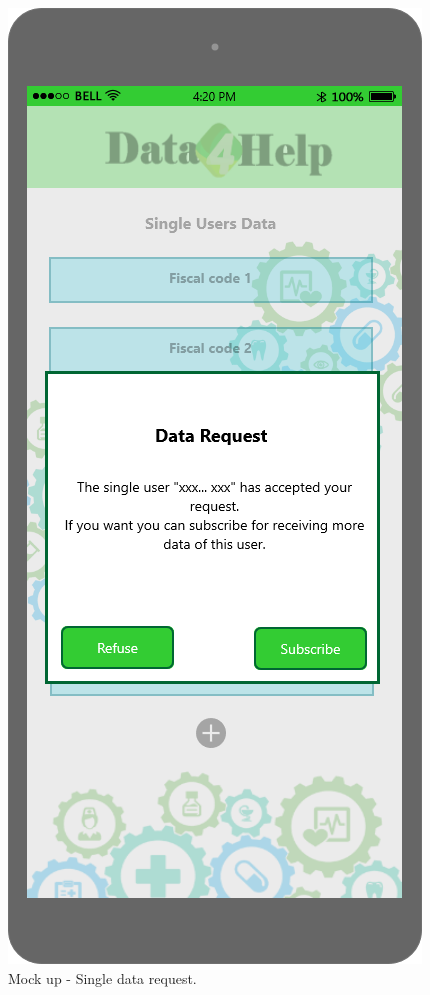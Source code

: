 \begin{figure}[h!]
\begin{minipage}[b]{0.25\textwidth}
    		\caption{Mock up - Single data request.}
  	\end{minipage}
	\hfill
 	\begin{minipage}[b]{0.25\textwidth}
    		\includegraphics[width=\textwidth]{./pictures/single_user_accept.png}

\end{minipage}
\end{figure}
